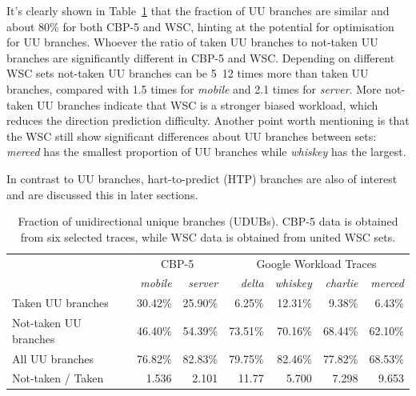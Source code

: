 It's clearly shown in Table~\ref{table:UU Branches} that the fraction of UU branches are similar and about 80\% for both CBP-5 and WSC, hinting at the potential for optimisation for UU branches. Whoever the ratio of taken UU branches to not-taken UU branches are significantly different in CBP-5 and WSC. Depending on different WSC sets not-taken UU branches can be 5~12 times more than taken UU branches, compared with 1.5 times for \textit{mobile} and 2.1 times for \textit{server}. More not-taken UU branches indicate that WSC is a stronger biased workload, which reduces the direction prediction difficulty. Another point worth mentioning is that the WSC still show significant differences about UU branches between sets: \textit{merced} has the smallest proportion of UU branches while \textit{whiskey} has the largest.\par\hspace*{\fill}\par


In contrast to UU branches, hart-to-predict (HTP) branches are also of interest and are discussed this in later sections.

\begin{table}[h!] 
\centering
\vskip 0.2in
\begin{tabular}{l r r r r r r}
\toprule{\LARGE}
\multirow{2}{*}{} & \multicolumn{2}{c}{CBP-5} & \multicolumn{4}{c}{Google Workload Traces} \\ 
 \cmidrule(l{3pt}r{3pt}){2-3} \cmidrule(l{3pt}r{3pt}){4-7}
  & \textit{mobile} & \textit{server}  & \textit{delta} & \textit{whiskey} & \textit{charlie} & \textit{merced}  \\ 
\midrule
Taken UU branches      & 30.42\%   & 25.90\%    & 6.25\%  & 12.31\%  & 9.38\%   & 6.43\% \\

Not-taken UU branches   & 46.40\%   & 54.39\%  & 73.51\%  & 70.16\%  & 68.44\%  & 62.10\% \\

All UU branches         & 76.82\%   & 82.83\%  & 79.75\%  & 82.46\%  & 77.82\%  & 68.53\% \\

Not-taken / Taken         & 1.536     & 2.101    & 11.77    & 5.700    & 7.298    & 9.653   \\
\bottomrule
\end{tabular}
\caption{\centering \small Fraction of unidirectional unique branches (UDUBs). CBP-5 data is obtained from six selected traces, while WSC data is obtained from united WSC sets.}
\label{table:UU Branches}
\end{table} %


